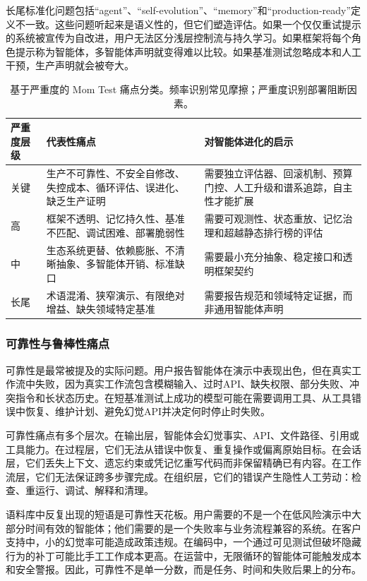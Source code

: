 长尾标准化问题包括``agent''、``self-evolution''、``memory''和``production-ready''定义不一致。这些问题听起来是语义性的，但它们塑造评估。如果一个仅仅重试提示的系统被宣传为自改进，用户无法区分浅层控制流与持久学习。如果框架将每个角色提示称为智能体，多智能体声明就变得难以比较。如果基准测试忽略成本和人工干预，生产声明就会被夸大。

\begin{table}[htbp]
\centering
\small
\begin{tabular}{p{}p{}p{}}
\toprule
\textbf{严重度层级} & \textbf{代表性痛点} & \textbf{对智能体进化的启示} \\
\midrule
关键 & 生产不可靠性、不安全自修改、失控成本、循环评估、误进化、缺乏生产证明 & 需要独立评估器、回滚机制、预算门控、人工升级和谱系追踪，自主性才能扩展 \\
高 & 框架不透明、记忆持久性、基准不匹配、调试困难、部署脆弱性 & 需要可观测性、状态重放、记忆治理和超越静态排行榜的评估 \\
中 & 生态系统更替、依赖膨胀、不清晰抽象、多智能体开销、标准缺口 & 需要最小充分抽象、稳定接口和透明框架契约 \\
长尾 & 术语混淆、狭窄演示、有限绝对增益、缺失领域特定基准 & 需要报告规范和领域特定证据，而非通用智能体声明 \\
\bottomrule
\end{tabular}
\caption{基于严重度的 Mom Test 痛点分类。频率识别常见摩擦；严重度识别部署阻断因素。}
\label{tab:ch7-severity-taxonomy-english}
\end{table}

\subsubsection{可靠性与鲁棒性痛点}
\label{sec:ch7-reliability-english}

可靠性是最常被提及的实际问题。用户报告智能体在演示中表现出色，但在真实工作流中失败，因为真实工作流包含模糊输入、过时API、缺失权限、部分失败、冲突指令和长状态历史。在短基准测试上成功的模型可能在需要调用工具、从工具错误中恢复、维护计划、避免幻觉API并决定何时停止时失败。

可靠性痛点有多个层次。在输出层，智能体会幻觉事实、API、文件路径、引用或工具能力。在过程层，它们无法从错误中恢复、重复操作或偏离原始目标。在会话层，它们丢失上下文、遗忘约束或凭记忆重写代码而非保留精确已有内容。在工作流层，它们无法保证跨多步骤完成。在组织层，它们的错误产生隐性人工劳动：检查、重运行、调试、解释和清理。

语料库中反复出现的短语是可靠性天花板。用户需要的不是一个在低风险演示中大部分时间有效的智能体；他们需要的是一个失败率与业务流程兼容的系统。在客户支持中，小的幻觉率可能造成政策违规。在编码中，一个通过可见测试但破坏隐藏行为的补丁可能比手工工作成本更高。在运营中，无限循环的智能体可能触发成本和安全警报。因此，可靠性不是单一分数，而是任务、时间和失败后果上的分布。

